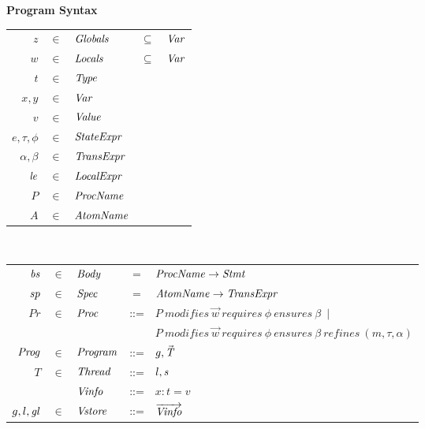 

\begin{figure}
\setlength{\tabcolsep}{3pt}
{\bf Program Syntax} \\
\begin{tabular}{rclcl}
$z$ & $\in$ & $\mathit{Globals}$ & $\subseteq$ &$\mathit{Var}$ \\
$w$ & $\in$ & $\mathit{Locals}$ & $\subseteq$ & $\mathit{Var}$ \\
$t$ & $\in$ & $\mathit{Type}$ \\
$x,y$ & $\in$ & $\mathit{Var}$ \\
$v$ &  $\in$ & $\mathit{Value}$ \\
$e, \tau, \phi$ & $\in$ & $\mathit{StateExpr}$ \\
$\alpha, \beta$ & $\in$ & $\mathit{TransExpr}$ \\
$\mathit{le}$ & $\in$ & $\mathit{LocalExpr}$ \\
$P$ & $\in$ & $\mathit{ProcName}$ \\
$A$ & $\in$ & $\mathit{AtomName}$ \\
\end{tabular}\\
\begin{tabular}{rclcl}
$\mathit{bs}$ & $\in$ & $\mathit{Body}$ & = & $\mathit{ProcName} \rightarrow \mathit{Stmt}$ \\
$\mathit{sp}$ & $\in$ & $\mathit{Spec}$ & = & $\mathit{AtomName} \rightarrow \mathit{TransExpr}$ \\
$Pr$ & $\in$ & $\mathit{Proc}$ &::= & $P\ \mathit{modifies}\ \overrightarrow{w}\ 
                                                        \mathit{requires}\ \phi\
                                                        \mathit{ensures}\ \beta\ \mid $\\
& & & & $P\ \mathit{modifies}\ \overrightarrow{w}\ 
                     \mathit{requires}\ \phi\
                     \mathit{ensures}\ \beta\
                     \mathit{refines}\ (m, \tau, \alpha)$\\
$\mathit{Prog}$ & $\in$ & $\mathit{Program}$ & ::= & $g, \vec{\mathit{T}}$ \\
$T$ & $\in$ & $\mathit{Thread}$ & ::=  & $l, \mathit{s}$ \\
&&$\mathit{Vinfo}$ & ::= & $x:t=v$ \\
$g,l,\mathit{gl}$ & $\in$ & $\mathit{Vstore}$ & ::= & $\overrightarrow{\mathit{Vinfo}}$ \\

\end{tabular}
\end{figure}

